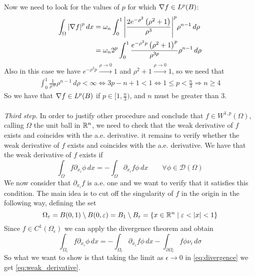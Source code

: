 Now we need to look for the values of $p$ for which \(\nabla f \in L^p(B)\):
\begin{align*}
    \int_\Omega \abs{\nabla f}^p \, dx & = \omega_n \int_0^1 \abs{\frac{2 e^{-\rho^2} \left(\rho^2 + 1\right)}{\rho^3}}^p \rho^{n-1} \, d\rho   \\
                                      & = \omega_n 2^p \int_0^1 \frac{e^{-\rho^2 p} \left(\rho^2 + 1 \right)^p}{\rho^{3p}} \rho^{n-1} \, d\rho
\end{align*}
Also in this case we have \(e^{-\rho^2 p} \overset{\rho \to 0}{\longrightarrow} 1\) and \(\rho^2 + 1 \overset{\rho \to 0}{\longrightarrow} 1\), so we need that
\[
    \begin{split}
        \int_0^1 \frac{1} {\rho^{3p}} \rho^{n-1} \, d\rho < \infty \iff 3p - n + 1 < 1 \iff 1 \leq p < \frac{n}{3} \Rightarrow n \geq 4
    \end{split}
\]
So we have that \(\nabla f \in L^p(B)\) if \(p \in [1, \frac{n}{3})\), and $n$
must be greater than 3.\\ \vspace{0.1cm}\\ \textit{Third step.} In order to
justify other procedure and conclude that $f \in W^{1,p}(\Omega)$, calling
$\Omega$ the unit ball in $\mathbb{R}^n$, we need to check that the weak derivative
of \(f\) exists and coincides with the a.e. derivative. it remains to verify
whether the weak derivative of \(f\) exists and coincides with the a.e.
derivative. We have that the weak derivative of \(f\) exists if
\begin{equation}\label{eq:weak_derivative}
    \int_\Omega f \partial_{x_i} \phi \, dx = - \int_\Omega \partial_{x_i} f \phi \, dx \qquad \forall \phi \in \mathcal{D}(\Omega)
\end{equation}
We now consider that $\partial_{x_i} f$ is a.e. one and we want to verify that it satisfies this condition.
The main idea is to cut off the singularity of \(f\) in the origin in the following way, defining the set
\[
    \Omega_\varepsilon = B(0, 1) \setminus B(0, \varepsilon) = B_1 \setminus B_\varepsilon = \left\{ x \in \mathbb{R}^n \mid \varepsilon < \abs{x} < 1 \right\}
\]
Since \(f \in C^1(\Omega_\epsilon)\) we can apply the divergence theorem and
obtain
\begin{equation}\label{eq:divergence}
    \int_{\Omega_\epsilon} f \partial_{x_i} \phi \, dx = -\int_{\Omega_\epsilon} \partial_{x_i} f \phi \, dx - \int_{\partial\Omega_\epsilon} f \phi \nu_i \, d\sigma
\end{equation}
So what we want to show is that taking the limit as \(\epsilon \to 0\) in \eqref{eq:divergence} we get \eqref{eq:weak_derivative}.

